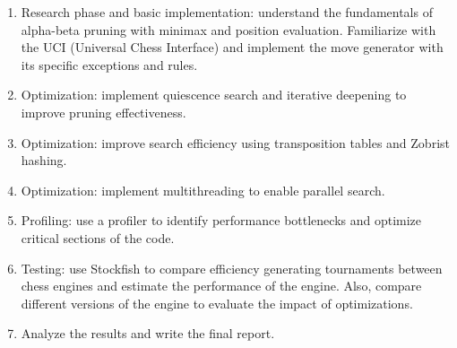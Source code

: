 \begin{enumerate}
    \item Research phase and basic implementation: understand the fundamentals of alpha-beta pruning with minimax and position evaluation. Familiarize with the UCI (Universal Chess Interface) and implement the move generator with its specific exceptions and rules.
    \item Optimization: implement quiescence search and iterative deepening to improve pruning effectiveness.
    \item Optimization: improve search efficiency using transposition tables and Zobrist hashing.
    \item Optimization: implement multithreading to enable parallel search.
    \item Profiling: use a profiler to identify performance bottlenecks and optimize critical sections of the code.
    \item Testing: use Stockfish to compare efficiency generating tournaments between chess engines and estimate the performance of the engine. Also, compare different versions of the engine to evaluate the impact of optimizations.
    \item Analyze the results and write the final report.
\end{enumerate}







